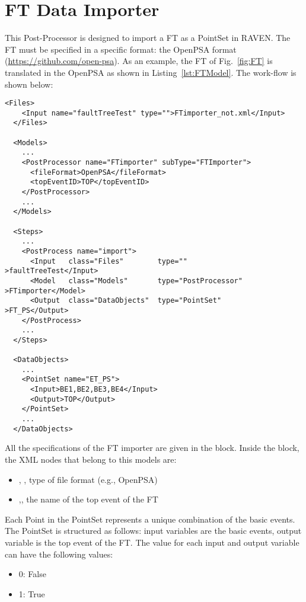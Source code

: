 \section{FT Data Importer}
\label{sec:FTdataImporter}

This Post-Processor is designed to import a FT as a PointSet in RAVEN.
The FT must be specified in a specific format: the OpenPSA format (\href{<url>}{https://github.com/open-psa}). 
As an example, the FT of Fig.~\ref{fig:FT} is translated in the OpenPSA as shown in Listing~\ref{lst:FTModel}.
The work-flow is shown below:

\begin{lstlisting}[style=XML,morekeywords={anAttribute},caption=FT Importer input example., label=lst:FT_PP_InputExample]
  <Files>
    <Input name="faultTreeTest" type="">FTimporter_not.xml</Input>
  </Files>
  
  <Models>
    ...
    <PostProcessor name="FTimporter" subType="FTImporter">
      <fileFormat>OpenPSA</fileFormat>
      <topEventID>TOP</topEventID>
    </PostProcessor> 
    ...  
  </Models>

  <Steps>
    ...
    <PostProcess name="import">
      <Input   class="Files"        type=""                >faultTreeTest</Input>
      <Model   class="Models"       type="PostProcessor"   >FTimporter</Model>
      <Output  class="DataObjects"  type="PointSet"        >FT_PS</Output>
    </PostProcess>
    ...
  </Steps>

  <DataObjects>
    ...
    <PointSet name="ET_PS">
      <Input>BE1,BE2,BE3,BE4</Input>
      <Output>TOP</Output>
    </PointSet>
    ...
  </DataObjects>
\end{lstlisting}

All the specifications of the FT importer are given in the 
 block. 
Inside the  block, the XML
nodes that belong to this models are:
\begin{itemize}
  \item  {}, , type of file format (e.g., OpenPSA)
  \item  {},, the name of the top event of the FT
\end{itemize}

Each Point in the PointSet represents a unique combination of the basic events.
The PointSet is structured as follows: input variables are the basic events, output variable is the top event of the FT.
The value for each input and output variable can have the following values:
\begin{itemize}
  \item  0: False
  \item  1: True
\end{itemize}

